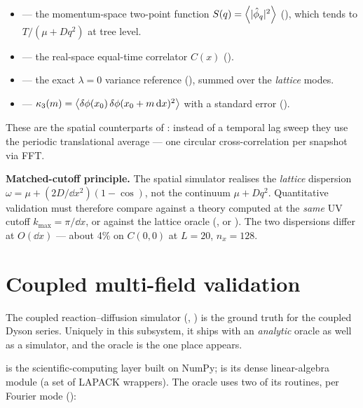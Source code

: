 \begin{itemize}
  \item {} --- the momentum-space two-point
        function $S(q) = \left\langle |\hat\phi_q|^{2} \right\rangle$ (), which tends to
        $T/(\mu + Dq^{2})$ at tree level.
  \item {} --- the real-space equal-time
        correlator $C(x)$ ().
  \item {} --- the exact $\lambda = 0$
        variance reference (), summed over the \emph{lattice} modes.
  \item {} --- $\kappa_3(m) =
        \left\langle \delta\phi(x_0)\,\delta\phi(x_0+m\,\mathrm{d} x)^{2} \right\rangle$ with a standard error
        ().
\end{itemize}

These are the spatial counterparts of : instead of a
temporal lag sweep they use the periodic translational average --- one circular
cross-correlation per snapshot via FFT.

\begin{gotcha}
\textbf{Matched-cutoff principle.} The spatial simulator realises the
\emph{lattice} dispersion $\omega = \mu + (2D/\dd x^{2})(1-\cos)$, not the continuum
$\mu + Dq^{2}$. Quantitative validation must therefore compare against a theory
computed at the \emph{same} UV cutoff $k_{\max} = \pi/\dd x$, or against the lattice
oracle (, or
). The two dispersions differ
at $O(\dd x)$ --- about 4\% on $C(0,0)$ at $L=20$, $n_x=128$.
\end{gotcha}

\section{Coupled multi-field validation}
\label{sec:coupled}

The coupled reaction--diffusion simulator
(, ) is the ground
truth for the coupled Dyson series. Uniquely in this subsystem, it ships with an
\emph{analytic} oracle as well as a simulator, and the oracle is the one place
 appears.

 is the scientific-computing layer built on NumPy;
 is its dense linear-algebra module (a set of LAPACK wrappers).
The oracle  uses two of its routines, per Fourier
mode ():

